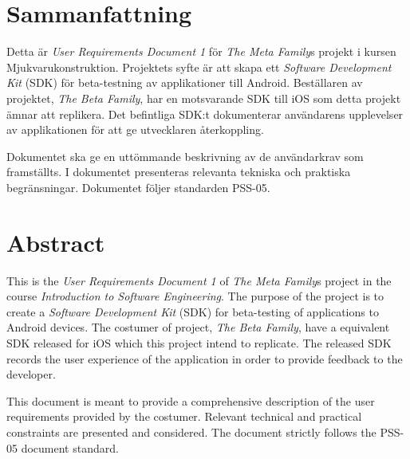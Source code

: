 \section*{Sammanfattning} %
Detta är \textit{User Requirements Document 1} för \textit{The Meta Family}s projekt i kursen Mjukvarukonstruktion. Projektets syfte är att skapa ett \textit{Software Development Kit} (SDK) för beta-testning av applikationer till Android. Beställaren av projektet, \textit{The Beta Family}, har en motsvarande SDK till iOS som detta projekt ämnar att replikera. Det befintliga SDK:t dokumenterar användarens upplevelser av applikationen för att ge utvecklaren återkoppling.

Dokumentet ska ge en uttömmande beskrivning av de användarkrav som framställts. I dokumentet presenteras relevanta tekniska och praktiska begränsningar. Dokumentet följer standarden PSS-05.

\section*{Abstract}
This is the \textit{User Requirements Document 1} of \textit{The Meta Family}s project in the course \textit{Introduction to Software Engineering}. The purpose of the project is to create a \textit{Software Development Kit} (SDK) for beta-testing of applications to Android devices. The costumer of project, \textit{The Beta Family}, have a equivalent SDK released for iOS which this project intend to replicate. The released SDK records the user experience of the application in order to provide feedback to the developer.

This document is meant to provide a comprehensive description of the user requirements provided by the costumer. Relevant technical and practical constraints are presented and considered. The document strictly follows the PSS-05 document standard.
